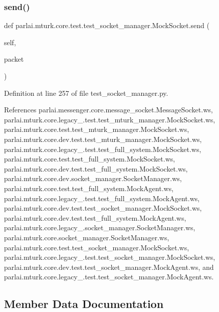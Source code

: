 \subsubsection{\texorpdfstring{send()}{send()}}
{\footnotesize\ttfamily def parlai.\+mturk.\+core.\+test.\+test\+\_\+socket\+\_\+manager.\+Mock\+Socket.\+send (\begin{DoxyParamCaption}\item[{}]{self,  }\item[{}]{packet }\end{DoxyParamCaption})}



Definition at line 257 of file test\+\_\+socket\+\_\+manager.\+py.



References parlai.\+messenger.\+core.\+message\+\_\+socket.\+Message\+Socket.\+ws, parlai.\+mturk.\+core.\+legacy\+\_.\+test.\+test\+\_\+mturk\+\_\+manager.\+Mock\+Socket.\+ws, parlai.\+mturk.\+core.\+test.\+test\+\_\+mturk\+\_\+manager.\+Mock\+Socket.\+ws, parlai.\+mturk.\+core.\+dev.\+test.\+test\+\_\+mturk\+\_\+manager.\+Mock\+Socket.\+ws, parlai.\+mturk.\+core.\+legacy\+\_.\+test.\+test\+\_\+full\+\_\+system.\+Mock\+Socket.\+ws, parlai.\+mturk.\+core.\+test.\+test\+\_\+full\+\_\+system.\+Mock\+Socket.\+ws, parlai.\+mturk.\+core.\+dev.\+test.\+test\+\_\+full\+\_\+system.\+Mock\+Socket.\+ws, parlai.\+mturk.\+core.\+dev.\+socket\+\_\+manager.\+Socket\+Manager.\+ws, parlai.\+mturk.\+core.\+test.\+test\+\_\+full\+\_\+system.\+Mock\+Agent.\+ws, parlai.\+mturk.\+core.\+legacy\+\_.\+test.\+test\+\_\+full\+\_\+system.\+Mock\+Agent.\+ws, parlai.\+mturk.\+core.\+dev.\+test.\+test\+\_\+socket\+\_\+manager.\+Mock\+Socket.\+ws, parlai.\+mturk.\+core.\+dev.\+test.\+test\+\_\+full\+\_\+system.\+Mock\+Agent.\+ws, parlai.\+mturk.\+core.\+legacy\+\_.\+socket\+\_\+manager.\+Socket\+Manager.\+ws, parlai.\+mturk.\+core.\+socket\+\_\+manager.\+Socket\+Manager.\+ws, parlai.\+mturk.\+core.\+test.\+test\+\_\+socket\+\_\+manager.\+Mock\+Socket.\+ws, parlai.\+mturk.\+core.\+legacy\+\_.\+test.\+test\+\_\+socket\+\_\+manager.\+Mock\+Socket.\+ws, parlai.\+mturk.\+core.\+dev.\+test.\+test\+\_\+socket\+\_\+manager.\+Mock\+Agent.\+ws, and parlai.\+mturk.\+core.\+legacy\+\_.\+test.\+test\+\_\+socket\+\_\+manager.\+Mock\+Agent.\+ws.



\subsection{Member Data Documentation}
\mbox{\label{classparlai_1_1mturk_1_1core_1_1test_1_1test__socket__manager_1_1MockSocket_a780461a398bbc8e99b6a149921e16f4d}} 
